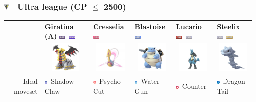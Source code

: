 \documentclass[8pt,aspectratio=169,compress]{beamer}
\newcommand{\fightingfull}{\includegraphics[height=0.15cm]{../../images/type/full/Fighting.png}}
\newcommand{\ghostfull}{\includegraphics[height=0.15cm]{../../images/type/full/Ghost.png}}
\newcommand{\dragonfull}{\includegraphics[height=0.15cm]{../../images/type/full/Dragon.png}}
\newcommand{\groundfull}{\includegraphics[height=0.15cm]{../../images/type/full/Ground.png}}
\newcommand{\psychicfull}{\includegraphics[height=0.15cm]{../../images/type/full/Psychic.png}}
\newcommand{\waterfull}{\includegraphics[height=0.15cm]{../../images/type/full/Water.png}}
\newcommand{\steelfull}{\includegraphics[height=0.15cm]{../../images/type/full/Steel.png}}
\newcommand{\fightingsimp}{\includegraphics[height=0.15cm]{../../images/type/simplified/fighting.png}}
\newcommand{\dragonsimp}{\includegraphics[height=0.15cm]{../../images/type/simplified/dragon.png}}
\newcommand{\ghostsimp}{\includegraphics[height=0.15cm]{../../images/type/simplified/ghost.png}}
\newcommand{\psysimp}{\includegraphics[height=0.15cm]{../../images/type/simplified/psy.png}}
\newcommand{\watersimp}{\includegraphics[height=0.15cm]{../../images/type/simplified/water.png}}
\begin{document}
\begin{frame}
\frametitle{\includegraphics[width=0.3cm]{../../pve/guide/ultra_league.png} ~Ultra league (CP $\leq$ 2500)}

\begin{tiny}
\begin{block}{}
\begin{center}

\begin{tabular}{rp{2cm}p{2cm}p{2cm}p{2cm}p{2cm}} 
  & \textbf{Giratina (A)} \hfill \ghostfull~\dragonfull& \textbf{Cresselia} \hfill \psychicfull & \textbf{Blastoise} \hfill\waterfull &\textbf{Lucario} \hfill\fightingfull~\steelfull & \textbf{Steelix} \hfill \steelfull~\groundfull \\ 
  & \multicolumn{1}{c}{\includegraphics[width=1.5cm]{../../images/pokemon/giratina_a}} &  \multicolumn{1}{c}{\includegraphics[width=1.5cm]{../../images/pokemon/cresselia} } & \multicolumn{1}{c}{\includegraphics[width=1.5cm]{../../images/pokemon/blastoise} } & \multicolumn{1}{c}{\includegraphics[width=1.5cm]{../../images/pokemon/lucario} } & \multicolumn{1}{c}{\includegraphics[width=1.5cm]{../../images/pokemon/steelix} }  \\ \hline 
   \multirow{3}{*}{Ideal moveset}  & \ghostsimp~Shadow Claw & \psysimp~Psycho Cut & \watersimp~Water Gun & \fightingsimp~Counter & \dragonsimp~Dragon Tail \\

\end{tabular}
\end{center}
\end{block}
\end{tiny}
\end{frame}
\end{document}
